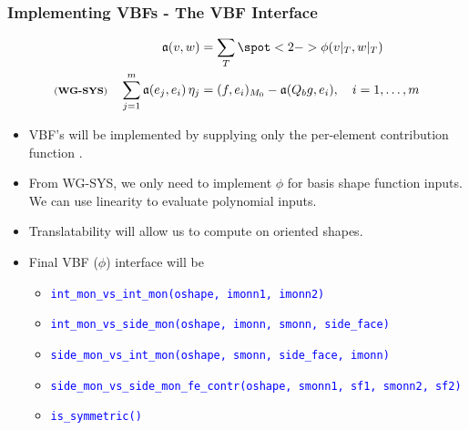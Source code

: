 \documentclass[compress]{beamer}
\begin{document}
\begin{frame}
  \frametitle{Implementing VBFs - The VBF Interface}
  \vspace{-.40cm}
  \begin{align*}
    \mathfrak{a}(v,w) &= \sum_T { \spot<2->{\phi}(v|_T,w|_T) }\\
    \text{\scriptsize (\textbf{WG-SYS})} \quad \sum_{j=1}^m{\mathfrak{a}(e_j, e_i) \,\eta_j} &= (f, e_i)_{M_0} - \mathfrak{a}(Q_b g, e_i),
      \quad i=1,\dots,m
  \end{align*}
  \pause
  \begin{itemize}[<+->]
    \item VBF's will be implemented by supplying only the per-element contribution function .
    \item From {\scriptsize WG-SYS}, we only need to implement $\phi$ for basis shape function inputs. We can use linearity
      to evaluate polynomial inputs.
    \item Translatability will allow us to compute on oriented shapes.
    \item Final VBF ($\phi$) interface will be\\
      \begin{itemize}[<+->]
        \item \texttt{\small \textcolor{blue}{int\_mon\_vs\_int\_mon(oshape, imonn1, imonn2)}}
        \item \texttt{\small \textcolor{blue}{int\_mon\_vs\_side\_mon(oshape, imonn, smonn, side\_face)}}
        \item \texttt{\small \textcolor{blue}{side\_mon\_vs\_int\_mon(oshape, smonn, side\_face, imonn)}}
        \item \texttt{\small \textcolor{blue}{side\_mon\_vs\_side\_mon\_fe\_contr(oshape, smonn1, sf1, smonn2, sf2)}}
        \item \texttt{\small \textcolor{blue}{is\_symmetric() }}
      \end{itemize}
  \end{itemize}
\end{frame}
\end{document}
